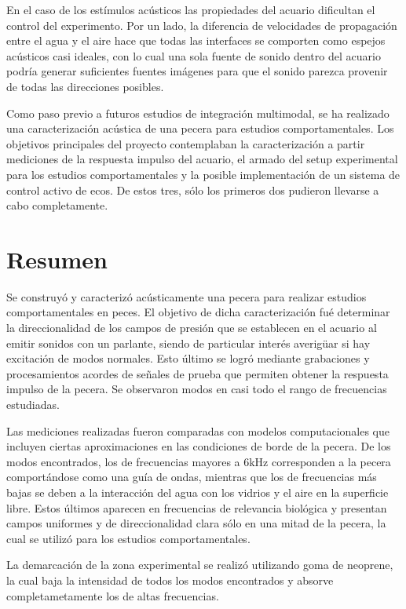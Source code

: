 \documentclass[12pt, a4paper, twoside]{report}
\begin{document}
En el caso de los estímulos acústicos las propiedades del acuario dificultan el control del experimento. Por un lado, la diferencia de velocidades de propagación entre el agua y el aire hace que todas las interfaces se comporten como espejos acústicos casi ideales, con lo cual una sola fuente de sonido dentro del acuario podría generar suficientes fuentes imágenes para que el sonido parezca provenir de todas las direcciones posibles. 

Como paso previo a futuros estudios de integración multimodal, se ha realizado una caracterización acústica de una pecera para estudios comportamentales. Los objetivos principales del proyecto contemplaban la caracterización a partir mediciones de la respuesta impulso del acuario, el armado del setup experimental para los estudios comportamentales y la posible implementación de un sistema de control activo de ecos. De estos tres, sólo los primeros dos pudieron llevarse a cabo completamente.

\chapter*{Resumen}

Se construyó y caracterizó acústicamente una pecera para realizar estudios comportamentales en peces. El objetivo de dicha caracterización fué determinar la direccionalidad de los campos de presión que se establecen en el acuario al emitir sonidos con un parlante, siendo de particular interés averigüar si hay excitación de modos normales. Esto último se logró mediante grabaciones y procesamientos acordes de señales de prueba que permiten obtener la respuesta impulso de la pecera. Se observaron modos en casi todo el rango de frecuencias estudiadas.

Las mediciones realizadas fueron comparadas con modelos computacionales que incluyen ciertas aproximaciones en las condiciones de borde de la pecera. De los modos encontrados, los de frecuencias mayores a 6kHz corresponden a la pecera comportándose como una guía de ondas, mientras que los de frecuencias más bajas se deben a la interacción del agua con los vidrios y el aire en la superficie libre. Estos últimos aparecen en frecuencias de relevancia biológica y presentan campos uniformes y de direccionalidad clara sólo en una mitad de la pecera, la cual se utilizó para los estudios comportamentales.

La demarcación de la zona experimental se realizó utilizando goma de neoprene, la cual baja la intensidad de todos los modos encontrados y absorve completametamente los de altas frecuencias.
\end{document}
